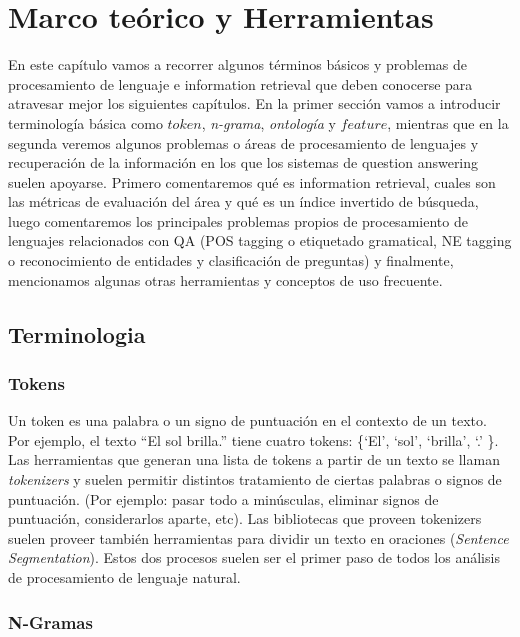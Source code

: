 \chapter{Marco teórico y Herramientas}
\label{chap:teorico}

En este capítulo vamos a recorrer algunos términos básicos y problemas de procesamiento de lenguaje e information retrieval que deben conocerse para atravesar mejor los siguientes capítulos. En la primer sección vamos a introducir terminología básica como $token$, \textit{n-grama}, \textit{ontología} y $feature$, mientras que en la segunda veremos algunos problemas o áreas de procesamiento de lenguajes y recuperación de la información en los que los sistemas de question answering suelen apoyarse. Primero comentaremos qué es information retrieval, cuales son las métricas de evaluación del área y qué es un índice invertido de búsqueda, luego comentaremos los principales problemas propios de procesamiento de lenguajes relacionados con QA (POS tagging o etiquetado gramatical, NE tagging o reconocimiento de entidades y clasificación de preguntas) y finalmente, mencionamos algunas otras herramientas y conceptos de uso frecuente. 

\section{Terminologia}

\subsection*{Tokens}

Un token es una palabra o un signo de puntuación en el contexto de un
texto.
Por ejemplo, el texto {\textquotedblleft}El sol
brilla.{\textquotedblright} tiene cuatro tokens:
\{{\textquoteleft}El{\textquoteright}, {\textquoteleft}sol{\textquoteright}, {\textquoteleft}brilla{\textquoteright}, {\textquoteleft}.{\textquoteright} \}. 
Las herramientas que generan una lista de tokens a partir de un texto se llaman
\textit{tokenizers} y suelen permitir distintos tratamiento de ciertas
palabras o signos de puntuación. (Por ejemplo: pasar todo a minúsculas, eliminar signos de puntuación, considerarlos aparte, etc).
Las bibliotecas que proveen tokenizers suelen proveer también herramientas para dividir un texto en
oraciones (\textit{Sentence Segmentation}). 
Estos dos procesos suelen ser el primer paso de todos los análisis de procesamiento de lenguaje natural.


\subsection*{N-Gramas}

